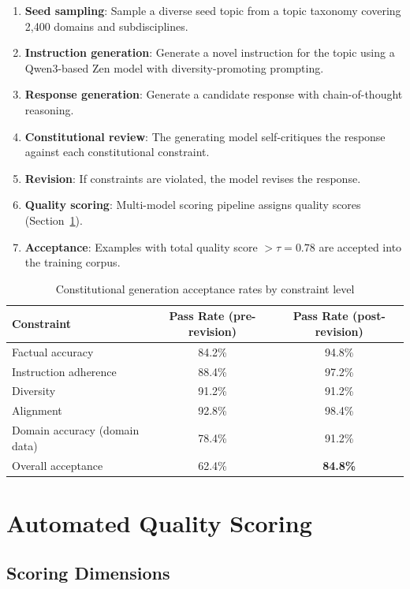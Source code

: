\documentclass[11pt,a4paper]{article}
\begin{document}
\begin{enumerate}
  \item \textbf{Seed sampling}: Sample a diverse seed topic from a topic taxonomy covering 2,400 domains and subdisciplines.
  \item \textbf{Instruction generation}: Generate a novel instruction for the topic using a Qwen3-based Zen model with diversity-promoting prompting.
  \item \textbf{Response generation}: Generate a candidate response with chain-of-thought reasoning.
  \item \textbf{Constitutional review}: The generating model self-critiques the response against each constitutional constraint.
  \item \textbf{Revision}: If constraints are violated, the model revises the response.
  \item \textbf{Quality scoring}: Multi-model scoring pipeline assigns quality scores (Section~\ref{sec:scoring}).
  \item \textbf{Acceptance}: Examples with total quality score $> \tau = 0.78$ are accepted into the training corpus.
\end{enumerate}

\begin{table}[H]
\centering
\caption{Constitutional generation acceptance rates by constraint level}
\label{tab:acceptance}
\begin{tabular}{lcc}
\toprule
Constraint & Pass Rate (pre-revision) & Pass Rate (post-revision) \\
\midrule
Factual accuracy & 84.2\% & 94.8\% \\
Instruction adherence & 88.4\% & 97.2\% \\
Diversity & 91.2\% & 91.2\% \\
Alignment & 92.8\% & 98.4\% \\
Domain accuracy (domain data) & 78.4\% & 91.2\% \\
\midrule
Overall acceptance & 62.4\% & \textbf{84.8\%} \\
\bottomrule
\end{tabular}
\end{table}

\section{Automated Quality Scoring}
\label{sec:scoring}

\subsection{Scoring Dimensions}
\end{document}
